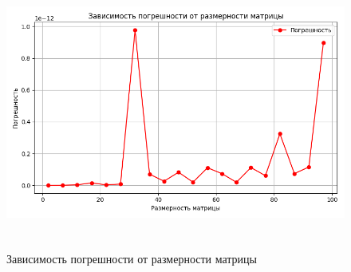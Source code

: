 \begin{figure}
  \centering
  \includegraphics[width=\textwidth, height=9cm]{figures/2.png}
  \caption{Зависимость погрешности от размерности матрицы}
  \label{fig:errors}
\end{figure}

